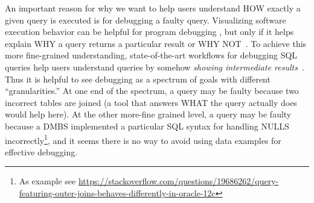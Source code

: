 \documentclass[letterpaper,11pt]{article}
\begin{document}
An important reason for why we want to help users understand HOW exactly a given query is executed
is for debugging a faulty query.
Visualizing software execution behavior
can be helpful for program debugging
\cite{DBLP:conf/chi/GathaniLB20,DBLP:journals/vlc/Reiss07},
but only if it helps explain WHY a query returns a particular result or WHY NOT~\cite{DBLP:conf/mud/MeliouGMS10}.
To achieve this more fine-grained understanding, state-of-the-art workflows for debugging SQL queries help users understand 
queries by somehow \emph{showing intermediate results}~\cite{
GrustKRS2011:SQLdebugging,
DBLP:journals/tods/GrustR13,
MRJ:ExplainingWrongQueries:2019,
DBLP:conf/sigmod/OlstonCS09}.
Thus it is helpful to see debugging as a spectrum of goals with different ``granularities.''
%
At one end of the spectrum, a query may be faulty because two incorrect tables are joined 
(a tool that answers WHAT the query actually does would help here).
At the other more-fine grained level, a query may be faulty because a DMBS implemented a particular SQL syntax for handling NULLS incorrectly\footnote{As example see \url{https://stackoverflow.com/questions/19686262/query-featuring-outer-joins-behaves-differently-in-oracle-12c}}, 
and it seems there is no way to avoid using data examples for effective debugging.





%
%
%
%
%
\end{document}
